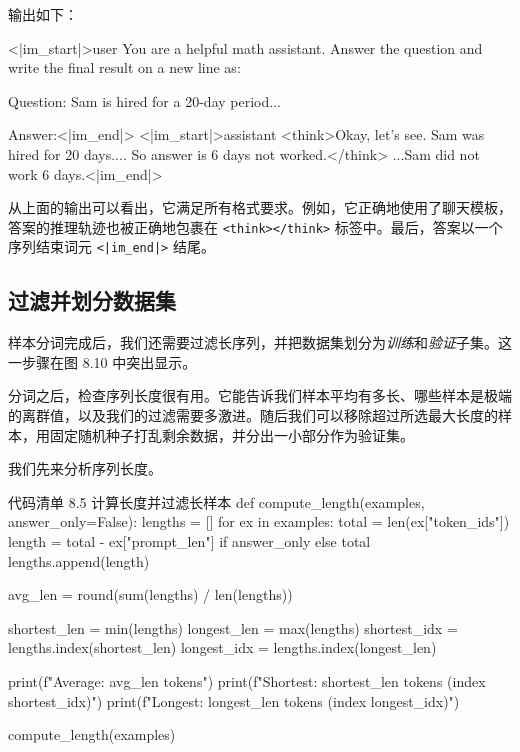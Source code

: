 输出如下：

\begin{codebox}
<|im_start|>user
You are a helpful math assistant.
Answer the question and write the final result on a new line as:

Question:
Sam is hired for a 20-day period...

Answer:<|im_end|>
<|im_start|>assistant
<think>Okay, let's see. Sam was hired for 20 days.... So answer is 6 days not worked.</think>
...Sam did not work \(\boxed{6}\) days.<|im_end|>
\end{codebox}

从上面的输出可以看出，它满足所有格式要求。例如，它正确地使用了聊天模板，答案的推理轨迹也被正确地包裹在 \texttt{\textless{}think\textgreater{}\textless{}/think\textgreater{}} 标签中。最后，答案以一个序列结束词元 \texttt{\textless{}|im\_end|\textgreater{}} 结尾。

\subsection{过滤并划分数据集}

样本分词完成后，我们还需要过滤长序列，并把数据集划分为\emph{训练}和\emph{验证}子集。这一步骤在图 8.10 中突出显示。


分词之后，检查序列长度很有用。它能告诉我们样本平均有多长、哪些样本是极端的离群值，以及我们的过滤需要多激进。随后我们可以移除超过所选最大长度的样本，用固定随机种子打乱剩余数据，并分出一小部分作为验证集。

我们先来分析序列长度。

\begin{codeboxt}{代码清单 8.5 计算长度并过滤长样本}
def compute_length(examples, answer_only=False):
    lengths = []
    for ex in examples:
        total = len(ex["token_ids"])
        length = total - ex["prompt_len"] if answer_only else total
        lengths.append(length)

    avg_len = round(sum(lengths) / len(lengths))

    shortest_len = min(lengths)
    longest_len = max(lengths)
    shortest_idx = lengths.index(shortest_len)
    longest_idx = lengths.index(longest_len)

    print(f"Average: {avg_len} tokens")
    print(f"Shortest: {shortest_len} tokens (index {shortest_idx})")
    print(f"Longest: {longest_len} tokens (index {longest_idx})")

compute_length(examples)
\end{codeboxt}

